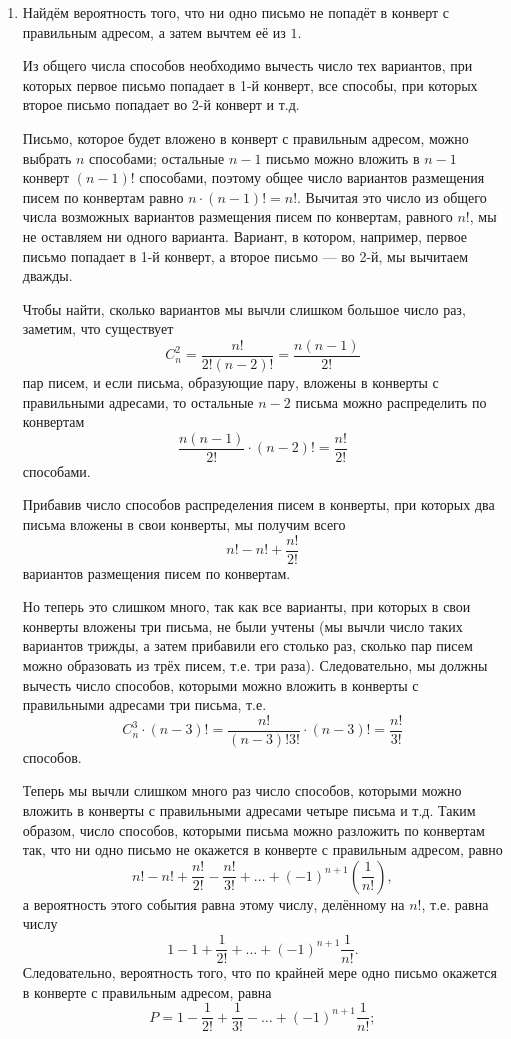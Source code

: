 \begin{enumerate}[label=\alph*)]
\item Найдём вероятность того, что ни одно письмо не попадёт в конверт с правильным адресом, а затем вычтем её из $1$.

Из общего числа способов необходимо вычесть число тех вариантов, при которых первое письмо попадает в 1-й конверт,
все способы, при которых второе письмо попадает во 2-й конверт и т.д.

Письмо, которое будет вложено в конверт с правильным адресом, можно выбрать $n$ способами;
остальные $n - 1$ письмо можно вложить в $n - 1$ конверт $ \left( n - 1 \right)!$ способами,
поэтому общее число вариантов размещения писем по конвертам равно $n \cdot \left( n - 1 \right)! = n!$.
Вычитая это число из общего числа возможных вариантов размещения писем по конвертам, равного $n!$,
мы не оставляем ни одного варианта.
Вариант, в котором, например, первое письмо попадает в 1-й конверт, а второе письмо --- во 2-й, мы вычитаем дважды.

Чтобы найти, сколько вариантов мы вычли слишком большое число раз, заметим, что существует 
$$C_n^2 =
\frac{n!}{2! \left( n-2 \right)!} =
\frac{n \left( n-1 \right) }{2!}$$
пар писем, и если письма, образующие пару, вложены в конверты с правильными адресами, то остальные $n - 2$ письма можно распределить по конвертам
$$\frac{n \left( n-1 \right)}{2!} \cdot \left( n-2 \right)! =
\frac{n!}{2!}$$
способами.

Прибавив число способов распределения писем в конверты, при которых два письма вложены в свои конверты, мы получим всего
$$n! - n! + \frac{n!}{2!}$$
вариантов размещения писем по конвертам.

Но теперь это слишком много,
так как все варианты, при которых в свои конверты вложены три письма, не были учтены
(мы вычли число таких вариантов трижды, а затем прибавили его столько раз,
сколько пар писем можно образовать из трёх писем, т.е. три раза).
Следовательно, мы должны вычесть число способов, которыми можно вложить в конверты с правильными адресами три письма, т.е.
$$C_n^3 \cdot \left( n-3 \right)! =
\frac{n!}{\left( n-3 \right)! 3!}\cdot \left( n-3 \right)! =
\frac{n!}{3!}$$
способов.

Теперь мы вычли слишком много раз число способов,
которыми можно вложить в конверты с правильными адресами четыре письма и т.д.
Таким образом, число способов, которыми письма можно разложить по конвертам так, что ни одно письмо не окажется в конверте с правильным адресом, равно
$$n! - n! + \frac{n!}{2!} - \frac{n!}{3!} + \dotsc + \left( -1 \right)^{n+1} \left( \frac{1}{n!} \right),$$
а вероятность этого события равна этому числу, делённому на $n!$, т.е. равна числу
$$1 - 1 + \frac{1}{2!} + \dotsc + \left( -1 \right)^{n+1} \frac{1}{n!}.$$
Следовательно, вероятность того, что по крайней мере одно письмо окажется в конверте с правильным адресом, равна
$$P =
1 - \frac{1}{2!} + \frac{1}{3!} - \dotsc + \left( -1 \right)^{n+1} \frac{1}{n!};$$


\end{enumerate}
